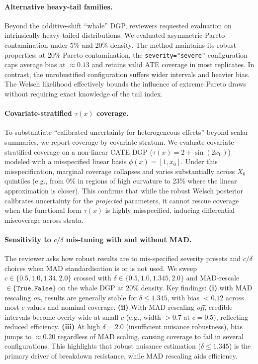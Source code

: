 \paragraph{Alternative heavy-tail families.}
Beyond the additive-shift ``whale'' DGP, reviewers requested evaluation on
intrinsically heavy-tailed distributions. We evaluated asymmetric Pareto contamination
under 5\% and 20\% density. The method maintains its robust properties:
at 20\% Pareto contamination, the \texttt{severity="severe"} configuration caps average
bias at $\approx 0.13$ and retains valid ATE coverage in most replicates. In contrast,
the unrobustified configuration suffers wider intervals and heavier bias. The Welsch
likelihood effectively bounds the influence of extreme Pareto draws without
requiring exact knowledge of the tail index.

\paragraph{Covariate-stratified $\tau(x)$ coverage.}
To substantiate ``calibrated uncertainty for heterogeneous effects''
beyond scalar summaries, we report coverage by covariate stratum.
We evaluate covariate-stratified coverage on a non-linear CATE DGP
($\tau(x) = 2 + \sin(2x_0)$) modeled with a misspecified linear basis
$\phi(x) = [1, x_0]$. Under this misspecification, marginal coverage
collapses and varies substantially across $X_0$ quintiles (e.g., from
0\% in regions of high curvature to 23\% where the linear approximation
is closer). This confirms that while the robust Welsch posterior
calibrates uncertainty for the \emph{projected} parameters,
it cannot rescue coverage when the functional form $\tau(x)$ is highly
misspecified, inducing differential miscoverage across strata.

\paragraph{Sensitivity to $c/\delta$ mis-tuning with and without MAD.}
The reviewer asks how robust results are to mis-specified severity
presets and $c/\delta$ choices when MAD standardisation is or is not
used. We sweep $c \in \{0.5, 1.0, 1.34, 2.0\}$ crossed with
$\delta \in \{0.5, 1.0, 1.345, 2.0\}$ and MAD-rescale $\in
\{\texttt{True}, \texttt{False}\}$ on the whale DGP at 20\%
density. Key findings: \textbf{(i)} with MAD rescaling
\emph{on}, results are generally stable for $\delta \le 1.345$, with bias
$< 0.12$ across most $c$ values and nominal coverage.
\textbf{(ii)} With MAD rescaling \emph{off}, credible intervals become
overly wide at small $c$ (e.g., width $>0.7$ at $c=0.5$), reflecting
reduced efficiency. \textbf{(iii)} At high $\delta = 2.0$ (insufficient
nuisance robustness), bias jumps to $\approx 0.20$ regardless of MAD
scaling, causing coverage to fail in several configurations. This
highlights that robust nuisance estimation ($\delta \le 1.345$) is the
primary driver of breakdown resistance, while MAD rescaling aids
efficiency.

